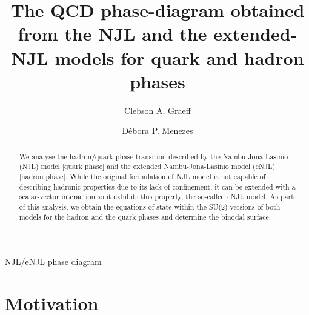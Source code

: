 \documentclass{ws-ijmpcs}
\begin{document}
{NJL/eNJL phase diagram}

%
\catchline{}{}{}{}{}
%

\title{The QCD phase-diagram obtained from the NJL and the extended-NJL models for quark and hadron phases}

\author{Clebson A. Graeff}

\address{Departamento de Física, Universidade Tecnológica Federal do Paraná, Via do Conhecimento, Km 1 CEP 85503-390\\
Pato Branco, Paraná,
Brazil
cgraeff@utfpr.ed.br}

\author{Débora P. Menezes}

\address{Departamento de Física, Universidade Federal de Santa Catarina\\ Florianópolis, SC, CP 476, CEP 88.040-900, Brazil\\
debora.p.m@ufsc.br}

\maketitle

\begin{history}
\end{history}

\begin{abstract}
We analyse the hadron/quark phase transition described by the Nambu-Jona-Lasinio (NJL) model [quark phase] and the extended Nambu-Jona-Lasinio model (eNJL) [hadron phase]. While the original formulation of NJL model is not capable of describing hadronic properties due to its lack of confinement, it can be extended with a scalar-vector interaction so it exhibits this property, the so-called  eNJL model. As part of this analysis, we obtain the equations of state within the SU(2) versions of both models for the hadron and the quark phases and determine the binodal surface. 
\end{abstract}


\section{Motivation}
\end{document}
